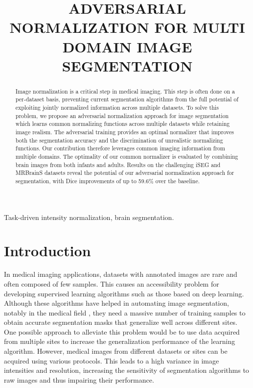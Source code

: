 \documentclass{article}
\title{ADVERSARIAL NORMALIZATION FOR MULTI DOMAIN IMAGE SEGMENTATION}
\begin{document}
\maketitle

\begin{abstract}
 Image normalization is a critical step in medical imaging. This step is often done on a per-dataset basis, preventing current segmentation algorithms from the full potential of exploiting jointly normalized information across multiple datasets.
 To solve this problem, we propose an adversarial normalization approach for image segmentation which learns common normalizing functions across multiple datasets while retaining image realism. The adversarial training provides an optimal normalizer that improves both the segmentation accuracy and the discrimination of unrealistic normalizing functions. Our contribution therefore leverages common imaging information from multiple domains. The optimality of our common normalizer is evaluated by combining brain images from both infants and adults. Results on the challenging iSEG and MRBrainS datasets reveal the potential of our adversarial normalization approach for segmentation, with Dice improvements of up to 59.6\% over the baseline.
\end{abstract}
%
\begin{keywords}
Task-driven intensity normalization, brain segmentation.
\end{keywords}

\section{Introduction}
\label{sec:intro}
In medical imaging applications, datasets with annotated images are rare and often composed of few samples. This causes an accessibility problem for developing supervised learning algorithms such as those based on deep learning. Although these algorithms have helped in automating image segmentation, notably in the medical field \cite{Kamnitsas2017,Dolz2019}, they need a massive number of training samples to obtain accurate segmentation masks that generalize well across different sites. One possible approach to alleviate this problem would be to use data acquired from multiple sites to increase the generalization performance of the learning algorithm. However, medical images from different datasets or sites can be acquired using various protocols. This leads to a high variance in image intensities and resolution, increasing the sensitivity of segmentation algorithms to raw images and thus impairing their performance.
\end{document}
